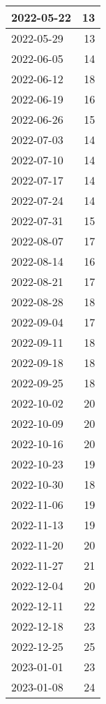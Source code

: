 \begin{longtable}[h!]{|l|r|}
2022-05-22 &            13 \\ \hline
2022-05-29 &            13 \\ \hline
2022-06-05 &            14 \\ \hline
2022-06-12 &            18 \\ \hline
2022-06-19 &            16 \\ \hline
2022-06-26 &            15 \\ \hline
2022-07-03 &            14 \\ \hline
2022-07-10 &            14 \\ \hline
2022-07-17 &            14 \\ \hline
2022-07-24 &            14 \\ \hline
2022-07-31 &            15 \\ \hline
2022-08-07 &            17 \\ \hline
2022-08-14 &            16 \\ \hline
2022-08-21 &            17 \\ \hline
2022-08-28 &            18 \\ \hline
2022-09-04 &            17 \\ \hline
2022-09-11 &            18 \\ \hline
2022-09-18 &            18 \\ \hline
2022-09-25 &            18 \\ \hline
2022-10-02 &            20 \\ \hline
2022-10-09 &            20 \\ \hline
2022-10-16 &            20 \\ \hline
2022-10-23 &            19 \\ \hline
2022-10-30 &            18 \\ \hline
2022-11-06 &            19 \\ \hline
2022-11-13 &            19 \\ \hline
2022-11-20 &            20 \\ \hline
2022-11-27 &            21 \\ \hline
2022-12-04 &            20 \\ \hline
2022-12-11 &            22 \\ \hline
2022-12-18 &            23 \\ \hline
2022-12-25 &            25 \\ \hline
2023-01-01 &            23 \\ \hline
2023-01-08 &            24 \\ \hline

\end{longtable}

